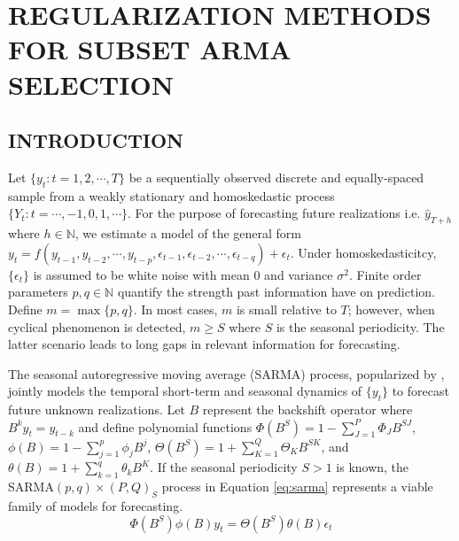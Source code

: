 \chapter{REGULARIZATION METHODS FOR SUBSET ARMA SELECTION}

\section{INTRODUCTION}

Let $\{y_t: t=1,2,\cdots,T\}$ be a sequentially observed discrete and equally-spaced sample from a weakly stationary and homoskedastic process $\{Y_t:t=\cdots,-1,0,1,\cdots\}$. For the purpose of forecasting future realizations i.e. $\hat{y}_{T+h}$ where $h\in\mathbb{N}$, we estimate a model of the general form $y_{t}=f(y_{t-1},y_{t-2},\cdots,y_{t-p},\epsilon_{t-1},\epsilon_{t-2},\cdots,\epsilon_{t-q})+\epsilon_t$. Under homoskedasticitcy, $\{\epsilon_t\}$ is assumed to be white noise with mean 0 and variance $\sigma^2$.  Finite order parameters $p,q\in\mathbb{N}$ quantify the strength past information have on prediction. Define $m=\max\{p,q\}$. In most cases, $m$ is small relative to $T$; however, when cyclical phenomenon is detected, $m\geq S$ where $S$ is the seasonal periodicity. The latter scenario leads to long gaps in relevant information for forecasting.

The seasonal autoregressive moving average (SARMA) process, popularized by \cite{Box1976}, jointly models the temporal short-term and seasonal dynamics of $\{y_t\}$ to forecast future unknown realizations. Let $B$ represent the backshift operator  where $B^ky_{t}=y_{t-k}$ and define polynomial functions $\Phi(B^S)=1-\sum\limits_{J=1}^P \Phi_J B^{SJ}$, $\phi(B)=1-\sum\limits_{j=1}^p \phi_j B^{j}$, $\Theta(B^S)=1+\sum\limits_{K=1}^Q \Theta_K B^{SK}$, and $\theta(B)=1+\sum\limits_{k=1}^q \theta_k B^{K}$. If the seasonal periodicity $S>1$ is known, the SARMA$(p,q)\times(P,Q)_{S}$ process in Equation \ref{eq:sarma} represents a viable family of models for forecasting.
\begin{equation}
\label{eq:sarma}
\Phi(B^S)\phi(B)y_t=\Theta(B^S)\theta(B)\epsilon_t
\end{equation}


